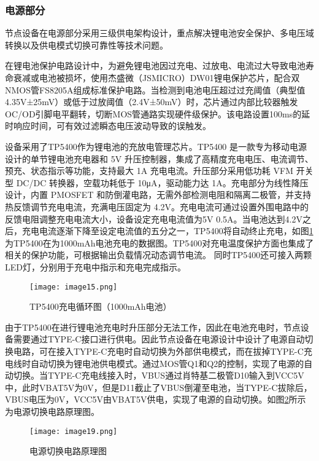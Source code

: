 \subsubsection{电源部分}

节点设备在电源部分采用三级供电架构设计，重点解决锂电池安全保护、多电压域转换以及供电模式切换可靠性等技术问题。

在锂电池保护电路设计中，为避免锂电池因过充电、过放电、电流过大导致电池寿命衰减或电池被损坏，使用杰盛微（JSMICRO）DW01锂电保护芯片，配合双NMOS管FS8205A组成标准保护电路。当检测到电池电压超过过充阈值（典型值4.35V±25mV）或低于过放阈值（2.4V±50mV）时，芯片通过内部比较器触发OC/OD引脚电平翻转，切断MOS管通路实现硬件级保护。该电路设置100ms的延时响应时间，可有效过滤瞬态电压波动导致的误触发。

设备采用了TP5400作为锂电池的充放电管理芯片。TP5400 是一款专为移动电源设计的单节锂电池充电器和 5V 升压控制器，集成了高精度充电电压、电流调节、预充、状态指示等功能，支持最大 1A 充电电流。升压部分采用低功耗 VFM 开关型 DC/DC 转换器，空载功耗低于 10μA，驱动能力达 1A。充电部分为线性降压设计，内置 PMOSFET 和防倒灌电路，无需外部检测电阻和隔离二极管，并支持热反馈调节充电电流，充满电压固定为 4.2V\cite{TP5400}。充电电流可通过设置外围电路中的反馈电阻调整充电电流大小，设备设定充电电流值为5V 0.5A。当电池达到4.2V之后，充电电流逐渐下降至设定电流值的五分之一，TP5400将自动终止充电，如图\ref{F.ECG_image15}为TP5400在为1000mAh电池充电的数据图\cite{TP5400}。TP5400对充电温度保护方面也集成了相关的保护功能，可根据输出负载情况动态调节电流。 同时TP5400还可接入两颗LED灯，分别用于充电中指示和充电完成指示。

\begin{figure}[hbt]
    \centering
    \texttt{[image: image15.png]}
    \caption{TP5400充电循环图（1000mAh电池）}
    \label{F.ECG_image15}
\end{figure}

由于TP5400在进行锂电池充电时升压部分无法工作，因此在电池充电时，节点设备需要通过TYPE-C接口进行供电。因此节点设备在电源设计中设计了电源自动切换电路，可在接入TYPE-C充电时自动切换为外部供电模式，而在拔掉TYPE-C充电线时自动切换为锂电池供电模式。通过MOS管Q1和Q2的控制，实现了电源的自动切换。当TYPE-C充电线接入时，VBUS通过肖特基二极管D10输入到VCC5V中，此时VBAT5V为0V，但是D11截止了VBUS倒灌至电池，当TYPE-C拔除后，VBUS电压为0V，VCC5V由VBAT5V供电，实现了电源的自动切换。如图\ref{F.ECG_image19}所示为电源切换电路原理图。

\begin{figure}[hbt]
    \centering
    \texttt{[image: image19.png]}
    \caption{电源切换电路原理图}
    \label{F.ECG_image19}
\end{figure}

